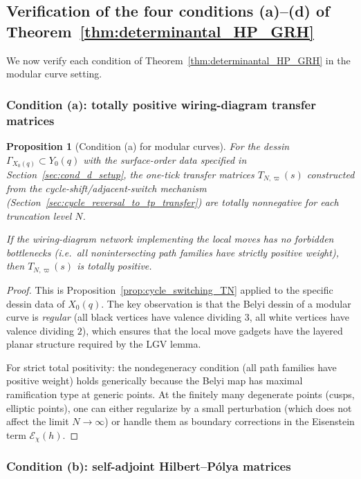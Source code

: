 \documentclass[11pt,oneside]{amsbook}
\numberwithin{equation}{section}
\theoremstyle{plain}
\newtheorem{proposition}[theorem]{Proposition}
\theoremstyle{definition}
\theoremstyle{remark}
\begin{document}
\subsection{Verification of the four conditions (a)--(d) of Theorem~\ref{thm:determinantal_HP_GRH}}
\label{sec:verify_abcd}

We now verify each condition of Theorem~\ref{thm:determinantal_HP_GRH} in the modular curve setting.

\subsubsection{Condition (a): totally positive wiring-diagram transfer matrices}

\begin{proposition}[Condition (a) for modular curves]
\label{prop:cond_a_modular}
For the dessin $\Gamma_{X_0(q)}\subset Y_0(q)$ with the surface-order data specified in Section~\ref{sec:cond_d_setup}, the one-tick transfer matrices $T_{N,\varpi}(s)$ constructed from the cycle-shift/adjacent-switch mechanism (Section~\ref{sec:cycle_reversal_to_tp_transfer}) are totally nonnegative for each truncation level $N$.

If the wiring-diagram network implementing the local moves has no forbidden bottlenecks (i.e.\ all nonintersecting path families have strictly positive weight), then $T_{N,\varpi}(s)$ is totally positive.
\end{proposition}

\begin{proof}
This is Proposition~\ref{prop:cycle_switching_TN} applied to the specific dessin data of $X_0(q)$.
The key observation is that the Belyi dessin of a modular curve is \emph{regular} (all black vertices have valence dividing $3$, all white vertices have valence dividing $2$), which ensures that the local move gadgets have the layered planar structure required by the LGV lemma.

For strict total positivity: the nondegeneracy condition (all path families have positive weight) holds generically because the Belyi map has maximal ramification type at generic points.
At the finitely many degenerate points (cusps, elliptic points), one can either regularize by a small perturbation (which does not affect the limit $N\to\infty$) or handle them as boundary corrections in the Eisenstein term $\mathcal{E}_\chi(h)$.
\end{proof}

\subsubsection{Condition (b): self-adjoint Hilbert--P\'olya matrices}
\end{document}

